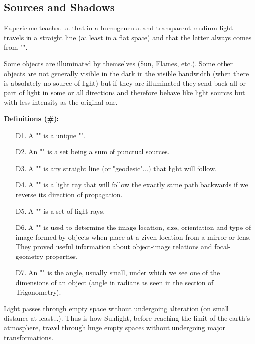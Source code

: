 	\pagebreak
	\subsection{Sources and Shadows}
	Experience teaches us that in a homogeneous and transparent medium light travels in a straight line (at least in a flat space) and that the latter always comes from "".
	
	Some objects are illuminated by themselves (Sun, Flames, etc.). Some other objects are not generally visible in the dark in the visible bandwidth (when there is absolutely no source of light) but if they are illuminated they send back all or part of light in some or all directions and therefore behave like light sources but with less intensity as the original one.
	
	\textbf{Definitions (\#\mydef):}
	\begin{enumerate}
		\item[D1.] A "" is a unique "".
		
		\item[D2.] An "" is a set being a sum of punctual sources.
		
		\item[D3.] A "" is any straight line (or "geodesic"...) that light will follow.
		
		\item[D4.] A "" is a light ray that will follow the exactly same path backwards if we reverse its direction of propagation.
		
		\item[D5.] A "" is a set of light rays.
		
		\item[D6.] A "" is used to determine the image location, size, orientation and type of image formed by objects when place at a given location from a mirror or lens. They proved useful information about object-image relations and focal-geometry properties.
		
		\item[D7.] An "" is the angle, usually small, under which we see  one of the dimensions of an object (angle in radians as seen in the section of Trigonometry).
	\end{enumerate}
	Light passes through empty space without undergoing alteration (on small distance at least...). Thus is how Sunlight, before reaching the limit of the earth's atmosphere, travel through huge empty spaces without undergoing major transformations.
	
